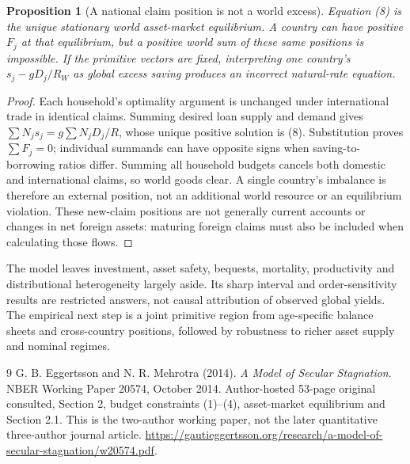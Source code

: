 \documentclass[11pt]{article}
\newtheorem{proposition}[theorem]{Proposition}
\theoremstyle{remark}
\begin{document}
\begin{proposition}[A national claim position is not a world excess]
Equation (8) is the unique stationary world asset-market equilibrium.
A country can have positive $F_j$ at that equilibrium, but a positive
world sum of these same positions is impossible. If the primitive vectors
are fixed, interpreting one country's $s_j-gD_j/R_W$ as global excess
saving produces an incorrect natural-rate equation.
\end{proposition}
\begin{proof}
Each household's optimality argument is unchanged under international
trade in identical claims. Summing desired loan supply and demand gives
$\sum N_js_j=g\sum N_jD_j/R$, whose unique positive solution is
(8). Substitution proves $\sum F_j=0$; individual summands can have
opposite signs when saving-to-borrowing ratios differ. Summing all household
budgets cancels both domestic and international claims, so world goods
clear. A single country's imbalance is therefore an external position,
not an additional world resource or an equilibrium violation.
These new-claim positions are not generally current accounts or changes
in net foreign assets: maturing foreign claims must also be included
when calculating those flows.
\end{proof}
The model leaves investment, asset safety, bequests, mortality, productivity
and distributional heterogeneity largely aside. Its sharp interval and
order-sensitivity results are restricted answers, not causal attribution
of observed global yields. The empirical next step is a joint primitive
region from age-specific balance sheets and cross-country positions,
followed by robustness to richer asset supply and nominal regimes.

\begin{thebibliography}{9}
 G. B. Eggertsson and N. R. Mehrotra (2014).
\emph{A Model of Secular Stagnation}. NBER Working Paper 20574,
October 2014. Author-hosted 53-page original consulted, Section 2,
budget constraints (1)--(4), asset-market equilibrium and Section 2.1.
This is the two-author working paper, not the later quantitative
three-author journal article.
\url{https://gautieggertsson.org/research/a-model-of-secular-stagnation/w20574.pdf}.
\end{thebibliography}
\end{document}
